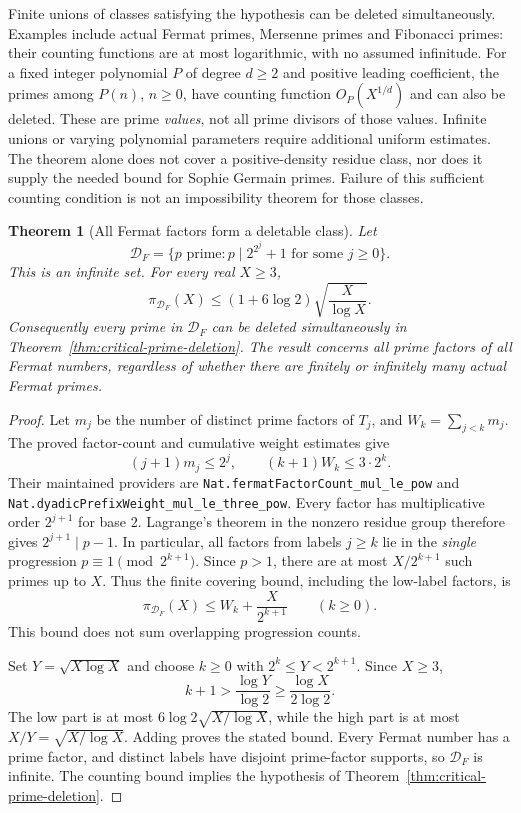 \documentclass[11pt]{article}
\newtheorem{theorem}{Theorem}[section]
\theoremstyle{definition}
\begin{document}
Finite unions of classes satisfying the hypothesis can be
deleted simultaneously. Examples include actual Fermat primes,
Mersenne primes and Fibonacci primes: their counting functions
are at most logarithmic, with no assumed infinitude.
For a fixed integer polynomial $P$ of degree $d\ge2$ and
positive leading coefficient, the primes among $P(n)$,
$n\ge0$, have counting function $O_P(X^{1/d})$ and can also
be deleted. These are prime \emph{values}, not all prime
divisors of those values. Infinite unions or varying polynomial
parameters require additional uniform estimates.
The theorem alone does not cover a positive-density residue
class, nor does it supply the needed bound for Sophie Germain
primes. Failure of this sufficient counting condition is not
an impossibility theorem for those classes.

\begin{theorem}[All Fermat factors form a deletable class]
\label{thm:all-fermat-factor-deletion}
Let
\[
 \mathcal D_F=\{p\text{ prime}:p\mid 2^{2^j}+1
                              \text{ for some }j\ge0\}.
\]
This is an infinite set. For every real $X\ge3$,
\[
 \pi_{\mathcal D_F}(X)
 \le(1+6\log2)\sqrt{\frac{X}{\log X}}.
\]
Consequently every prime in $\mathcal D_F$ can be deleted
simultaneously in Theorem~\ref{thm:critical-prime-deletion}.
The result concerns all prime factors of all Fermat numbers,
regardless of whether there are finitely or infinitely many
actual Fermat primes.
\end{theorem}

\begin{proof}
Let $m_j$ be the number of distinct prime factors of $T_j$,
and $W_k=\sum_{j<k}m_j$. The proved factor-count and cumulative
weight estimates give
\[
 (j+1)m_j\le2^j,\qquad (k+1)W_k\le3\cdot2^k.
\]
Their maintained providers are
\texttt{Nat.fermatFactorCount\_mul\_le\_pow} and
\texttt{Nat.dyadicPrefixWeight\_mul\_le\_three\_pow}.
Every factor has multiplicative order $2^{j+1}$ for base $2$.
Lagrange's theorem in the nonzero residue group therefore
gives $2^{j+1}\mid p-1$. In particular, all factors from
labels $j\ge k$ lie in the \emph{single} progression
$p\equiv1\pmod{2^{k+1}}$. Since $p>1$, there are at most
$X/2^{k+1}$ such primes up to $X$. Thus the finite covering
bound, including the low-label factors, is
\[
 \pi_{\mathcal D_F}(X)\le W_k+\frac{X}{2^{k+1}}
 \qquad(k\ge0).
\]
This bound does not sum overlapping progression counts.

Set $Y=\sqrt{X\log X}$ and choose $k\ge0$ with
$2^k\le Y<2^{k+1}$. Since $X\ge3$,
\[
 k+1>\frac{\log Y}{\log2}
       \ge\frac{\log X}{2\log2}.
\]
The low part is at most
$6\log2\sqrt{X/\log X}$, while the high part is at most
$X/Y=\sqrt{X/\log X}$. Adding proves the stated bound.
Every Fermat number has a prime factor, and distinct labels
have disjoint prime-factor supports, so $\mathcal D_F$ is
infinite. The counting bound implies the hypothesis of
Theorem~\ref{thm:critical-prime-deletion}.
\end{proof}
\end{document}
